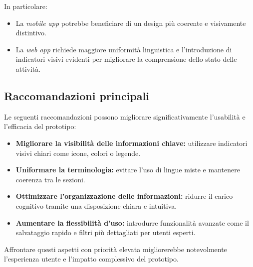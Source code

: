 \documentclass[a4paper,12pt]{article}
\begin{document}
In particolare:
\begin{itemize}
    \item La \textit{mobile app} potrebbe beneficiare di un design più coerente e visivamente distintivo.
    \item La \textit{web app} richiede maggiore uniformità linguistica e l’introduzione di indicatori visivi evidenti per migliorare la comprensione dello stato delle attività.
\end{itemize}

\subsection*{Raccomandazioni principali}
Le seguenti raccomandazioni possono migliorare significativamente l’usabilità e l’efficacia del prototipo:
\begin{itemize}
    \item \textbf{Migliorare la visibilità delle informazioni chiave:} utilizzare indicatori visivi chiari come icone, colori o legende.
    \item \textbf{Uniformare la terminologia:} evitare l’uso di lingue miste e mantenere coerenza tra le sezioni.
    \item \textbf{Ottimizzare l’organizzazione delle informazioni:} ridurre il carico cognitivo tramite una disposizione chiara e intuitiva.
    \item \textbf{Aumentare la flessibilità d’uso:} introdurre funzionalità avanzate come il salvataggio rapido e filtri più dettagliati per utenti esperti.
\end{itemize}

Affrontare questi aspetti con priorità elevata migliorerebbe notevolmente l’esperienza utente e l’impatto complessivo del prototipo.
\end{document}
